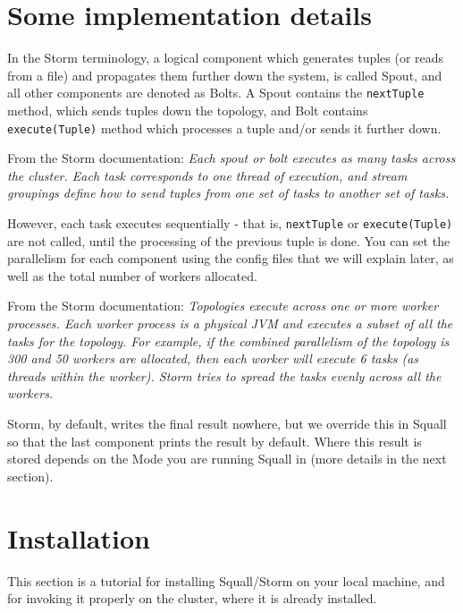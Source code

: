\documentclass[a4paper,10pt]{article}
\begin{document}
\section{Some implementation details}
\label{ch:implementation}
\vspace{2mm}
In the Storm terminology, a logical component which generates tuples (or reads from a file) and propagates them further down the system, is called Spout, and all other components are denoted as Bolts. A Spout contains the \verb|nextTuple| method, which sends tuples down the topology, and Bolt contains \verb|execute(Tuple)| method which processes a tuple and/or sends it further down. 

From the Storm documentation:
\textit{Each spout or bolt executes as many tasks across the cluster. Each task corresponds to one thread of execution, and stream groupings define how to send tuples from one set of tasks to another set of tasks.}

However, each task executes sequentially - that is, \verb|nextTuple| or \verb|execute(Tuple)| are not called, until the processing of the previous tuple is done. You can set the parallelism for each component using the config files that we will explain later, as well as the total number of workers allocated. 

From the Storm documentation:
\textit{Topologies execute across one or more worker processes. Each worker process is a physical JVM and executes a subset of all the tasks for the topology. For example, if the combined parallelism of the topology is 300 and 50 workers are allocated, then each worker will execute 6 tasks (as threads within the worker). Storm tries to spread the tasks evenly across all the workers.}

Storm, by default, writes the final result nowhere, but we override this in Squall so that the last component prints the result by default. Where this result is stored depends on the Mode you are running Squall in (more details in the next section).

\section{Installation}
\label{ch:installation}
\vspace{2mm}
This section is a tutorial for installing Squall/Storm on your local machine, and for invoking it properly on the cluster, where it is already installed.
\end{document}
